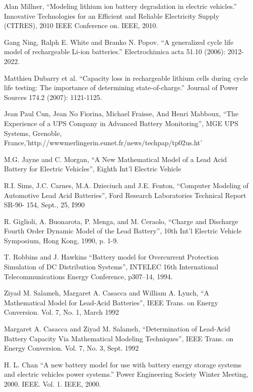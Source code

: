 

Alan Millner, ``Modeling lithium ion battery degradation in electric vehicles.'' Innovative Technologies for an Efficient and Reliable Electricity Supply (CITRES), 2010 IEEE Conference on. IEEE, 2010.

Gang Ning, Ralph E. White and Branko N. Popov. ``A generalized cycle life model of rechargeable Li-ion batteries.'' Electrochimica acta 51.10 (2006): 2012-2022.

Matthieu Dubarry et al. ``Capacity loss in rechargeable lithium cells during cycle life testing: The importance of determining state-of-charge.'' Journal of Power Sources 174.2 (2007): 1121-1125.

Jean Paul Cun, Jean No Fiorina, Michael Fraisse, And Henri Mabboux, ``The Experience of a
UPS Company in Advanced Battery Monitoring'',
MGE UPS Systems, Grenoble, France,'http://wwwmerlingerin.eunet.fr/news/techpap/tp02us.ht'

M.G. Jayne and  C. Morgan, ``A New
Mathematical Model of a Lead Acid Battery for
Electric Vehicles'', Eighth Int'l Electric Vehicle


R.I. Sims, J.C. Carnes, M.A. Dzieciuch and
J.E. Fenton, ``Computer Modeling of Automotive
Lead Acid Batteries'', Ford Research Laboratories
Technical Report SR-90- 154, Sept., 25, I990

R. Giglioli, A. Buonarota, P. Menga, and M. Ceraolo, ``Charge and Discharge Fourth
Order Dynamic Model of the Lead Battery'', 10th Int'l
Electric Vehicle Symposium, Hong Kong, 1990, p. 1-9.

T. Robbins and J. Hawkins ``Battery model for
Overcurrent Protection Simulation of DC Distribution Systems'', INTELEC 16th
International Telecommunications Energy
Conference, p307--14, 1994.

Ziyad M. Salameh, Margaret A. Casacca and William
A. Lynch, ``A Mathematical Model for Lead-Acid
Batteries'', IEEE Trans. on Energy Conversion. Vol. 7,
No. 1, March 1992

Margaret A. Casacca and Ziyad M. Salameh,
``Determination of Lead-Acid Battery Capacity
Via Mathematical Modeling Techniques'', IEEE
Trans. on Energy Conversion. Vol. 7, No. 3, Sept.
1992

H. L. Chan ``A new battery model for use with battery energy storage systems and electric vehicles power systems.'' Power Engineering Society Winter Meeting, 2000. IEEE. Vol. 1. IEEE, 2000.


